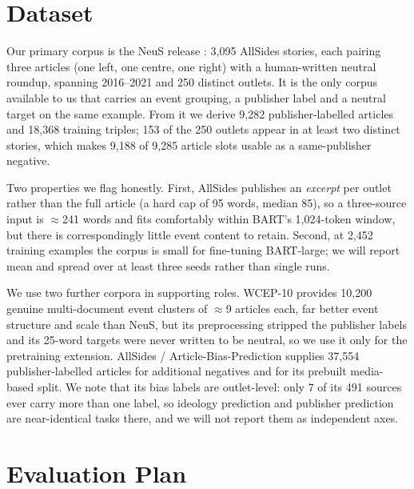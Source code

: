 \documentclass[11pt]{article}
\begin{document}
\section{Dataset}

Our primary corpus is the NeuS release \citep{lee2022neus}: 3{,}095 AllSides
stories, each pairing three articles (one left, one centre, one right) with a
human-written neutral roundup, spanning 2016--2021 and 250 distinct outlets. It
is the only corpus available to us that carries an event grouping, a publisher
label and a neutral target on the same example. From it we derive 9{,}282
publisher-labelled articles and 18{,}368 training triples; 153 of the 250 outlets
appear in at least two distinct stories, which makes 9{,}188 of 9{,}285 article
slots usable as a same-publisher negative.

Two properties we flag honestly. First, AllSides publishes an \emph{excerpt} per
outlet rather than the full article (a hard cap of 95 words, median 85), so
a three-source input is $\approx$241 words and fits comfortably within BART's
1{,}024-token window, but there is correspondingly little event content to
retain. Second, at 2{,}452 training examples the corpus is small for fine-tuning
BART-large; we will report mean and spread over at least three seeds rather than
single runs.

We use two further corpora in supporting roles. WCEP-10
\citep{ghalandari2020wcep} provides 10{,}200 genuine multi-document event
clusters of $\approx$9 articles each, far better event structure and scale
than NeuS, but its preprocessing stripped the publisher labels and its 25-word
targets were never written to be neutral, so we use it only for the pretraining
extension. AllSides / Article-Bias-Prediction \citep{baly2020detect} supplies
37{,}554 publisher-labelled articles for additional negatives and for its
prebuilt media-based split. We note that its bias labels are outlet-level: only 7
of its 491 sources ever carry more than one label, so ideology prediction and
publisher prediction are near-identical tasks there, and we will not report them
as independent axes.

\section{Evaluation Plan}
\end{document}
